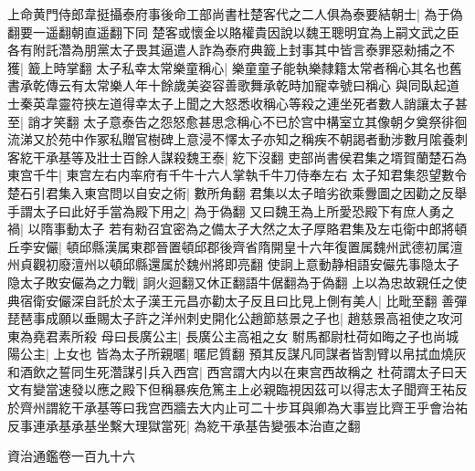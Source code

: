 上命黄門侍郎韋挺攝泰府事後命工部尚書杜楚客代之二人俱為泰要結朝士|{
	為于偽翻要一遥翻朝直遥翻下同}
楚客或懷金以賂權貴因說以魏王聰明宜為上嗣文武之臣各有附託濳為朋黨太子畏其逼遣人詐為泰府典籖上封事其中皆言泰罪惡勑捕之不獲|{
	籖上時掌翻}
太子私幸太常樂童稱心|{
	樂童童子能執樂隸籍太常者稱心其名也舊書承乾傳云有太常樂人年十餘歲美姿容善歌舞承乾時加寵幸號曰稱心}
與同臥起道士秦英韋靈符挾左道得幸太子上聞之大怒悉收稱心等殺之連坐死者數人誚讓太子甚至|{
	誚才笑翻}
太子意泰告之怨怒愈甚思念稱心不已於宫中構室立其像朝夕奠祭徘徊流涕又於苑中作冢私贈官樹碑上意浸不懌太子亦知之稱疾不朝謁者動涉數月隂養刺客紇干承基等及壯士百餘人謀殺魏王泰|{
	紇下沒翻}
吏部尚書侯君集之壻賀蘭楚石為東宫千牛|{
	東宫左右内率府有千牛十六人掌執千牛刀侍奉左右}
太子知君集怨望數令楚石引君集入東宫問以自安之術|{
	數所角翻}
君集以太子暗劣欲乘釁圖之因勸之反舉手謂太子曰此好手當為殿下用之|{
	為于偽翻}
又曰魏王為上所愛恐殿下有庶人勇之禍|{
	以隋事動太子}
若有勑召宜密為之備太子大然之太子厚賂君集及左屯衛中郎將頓丘李安儼|{
	頓邱縣漢属東郡晉置頓邱郡後齊省隋開皇十六年復置属魏州武德初属澶州貞觀初廢澶州以頓邱縣還属於魏州將即亮翻}
使詗上意動静相語安儼先事隐太子隐太子敗安儼為之力戰|{
	詗火迴翻又休正翻語牛倨翻為于偽翻}
上以為忠故親任之使典宿衛安儼深自託於太子漢王元昌亦勸太子反且曰比見上側有美人|{
	比毗至翻}
善彈琵琶事成願以垂賜太子許之洋州刺史開化公趙節慈景之子也|{
	趙慈景高袓使之攻河東為堯君素所殺}
母曰長廣公主|{
	長廣公主高袓之女}
駙馬都尉杜荷如晦之子也尚城陽公主|{
	上女也}
皆為太子所親暱|{
	暱尼質翻}
預其反謀凡同謀者皆割臂以帛拭血燒灰和酒飲之誓同生死濳謀引兵入西宫|{
	西宫謂大内以在東宫西故稱之}
杜荷謂太子曰天文有變當速發以應之殿下但稱暴疾危篤主上必親臨視因茲可以得志太子聞齊王祐反於齊州謂紇干承基等曰我宫西牆去大内止可二十步耳與卿為大事豈比齊王乎會治祐反事連承基承基坐繫大理獄當死|{
	為紇干承基告變張本治直之翻}


資治通鑑卷一百九十六
